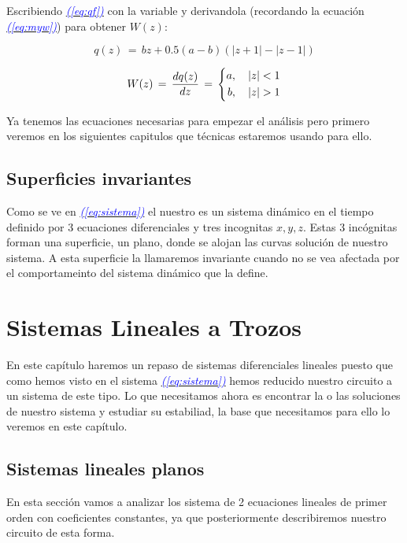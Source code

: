 \documentclass[12pt,a4paper]{report} %
\newcommand{\eref}[1]{\hyperref[#1]{\textcolor{blue}{\textit{(\ref*{#1})}}}}
\begin{document}
    Escribiendo \eref{eq:qf} con la variable  y derivandola (recordando la ecuación \eref{eq:myw}) para obtener $W(z)$:
    
    \begin{equation}
    	q(z)\,=\,bz+0.5(a-b)(|z+1|-|z-1|)
    	\label{eq:qfz}
    \end{equation}
    
    \begin{equation}
    	W(z)\,=\,\frac{dq(z)}{dz}\,=\,
    		\label{eq:wz}
    		\scalebox{1}{$\displaystyle
    			\left\{
    			\begin{aligned}
    				a, \quad   |z| < 1\\
    				b, \quad   |z| > 1
    			\end{aligned}
    			\right.
    			$}
    \end{equation}
    
	Ya tenemos las ecuaciones necesarias para empezar el análisis pero primero veremos en los siguientes capitulos que técnicas estaremos usando para ello.
	\newpage
	\section{Superficies invariantes}
	Como se ve en \eref{eq:sistema} el nuestro es un sistema dinámico en el tiempo definido por 3 ecuaciones diferenciales y tres incognitas $x, y, z$. Estas 3 incógnitas forman una superficie, un plano, donde se alojan las curvas solución de nuestro sistema. A esta superficie la llamaremos invariante cuando no se vea afectada por el comportameinto del sistema dinámico que la define. 
	
	
	
	\chapter{Sistemas Lineales a Trozos}
	En este capítulo haremos un repaso de sistemas diferenciales lineales puesto que como hemos visto en el sistema \eref{eq:sistema} hemos reducido nuestro circuito a un sistema de este tipo. Lo que necesitamos ahora es encontrar la o las soluciones de nuestro sistema y estudiar su estabiliad, la base que necesitamos para ello lo veremos en este capítulo.
	\newpage
	\section{Sistemas lineales planos}
	En esta sección vamos a analizar los sistema de 2 ecuaciones lineales de primer orden con coeficientes constantes, ya que posteriormente describiremos nuestro circuito de esta forma.
	
\end{document}
